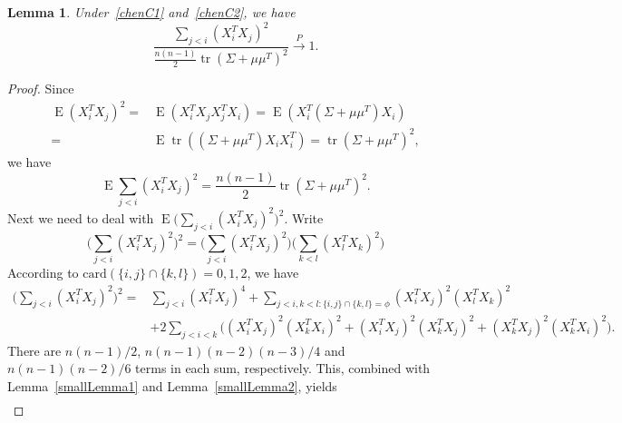 \documentclass[review]{elsarticle}
\DeclareMathOperator{\mytr}{tr}
\DeclareMathOperator{\myE}{E}
\theoremstyle{plain}
\newtheorem{lemma}{Lemma}
\theoremstyle{definition}
\theoremstyle{remark}
\begin{document}
\begin{lemma}\label{ratioLemma}
    Under~\eqref{chenC1} and~\eqref{chenC2}, we have
        \begin{equation*}
        \frac{\sum_{j<i}{(X_i^T X_j)}^2}{\frac{n(n-1)}{2}\mytr  (\Sigma+\mu\mu^T)^2}
        \xrightarrow{P}1.
        \end{equation*}
\end{lemma}
\begin{proof}
    Since
        \begin{equation*}
        \begin{aligned}
            \myE(X_i^T X_j)^2=&
            \myE(X_i^T X_j X_j^T X_i)=
            \myE(X_i^T (\Sigma+\mu \mu^T) X_i)\\
            =&
            \myE\mytr ((\Sigma+\mu \mu^T) X_i X_i^T)=\mytr {(\Sigma+\mu \mu^T)}^2,
        \end{aligned}
        \end{equation*}
   we have 
        \begin{equation*}
        \myE\sum_{j<i}(X_i^T X_j)^2=\frac{n(n-1)}{2}\mytr {(\Sigma+\mu\mu^T)}^2.
        \end{equation*}
    Next we need to deal with $\myE \big(\sum_{j<i}{(X_i^T X_j)}^2\big)^2$.
    Write 
    \begin{equation*}
    \big(\sum_{j<i}{(X_i^T X_j)}^2\big)^2=
    \big(\sum_{j<i}{(X_i^T X_j)}^2\big)
    \big(\sum_{k<l}{(X_l^T X_k)}^2\big)
    \end{equation*}
    According to $\mathrm{card}(\{i,j\}\cap\{k,l\})=0,1,2$, we have
    \begin{equation*}%
    \begin{aligned}
        \big(\sum_{j<i}{(X_i^T X_j)}^2\big)^2
        =&
        \sum_{j<i}{(X_i^T X_j)}^4
         +
        \sum_{j<i,k<l:\{i,j\}\cap \{k,l\}=\phi}{(X_i^T X_j)}^2{(X_l^T X_k)}^2\\
        &+2\sum_{j<i<k}\Big(
        {(X_i^T X_j)}^2{(X_k^T X_i)}^2+
{(X_i^T X_j)}^2{(X_k^T X_j)}^2
        +
{(X_k^T X_j)}^2{(X_k^T X_i)}^2
        \Big).
    \end{aligned}
    \end{equation*}
    There are $n(n-1)/2$, $n(n-1)(n-2)(n-3)/4$ and $n(n-1)(n-2)/6$ terms in each sum, respectively.
    This, combined with Lemma~\ref{smallLemma1} and Lemma~\ref{smallLemma2}, yields
    \begin{equation*}
    \begin{aligned}

\end{aligned}
\end{equation*}
\end{proof}
\end{document}
